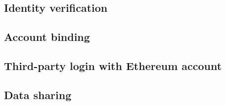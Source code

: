 \subsection{Identity verification}
\subsection{Account binding}
\subsection{Third-party login with Ethereum account}
\subsection{Data sharing}